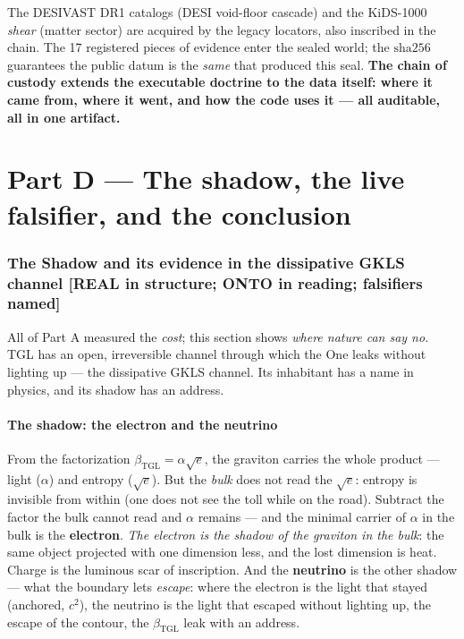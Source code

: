 \documentclass[11pt]{article}
\newcommand{\bTGL}{\beta_{\mathrm{TGL}}}\newcommand{\Msun}{M_{\odot}}\newcommand{\TGL}{\mathrm{TGL}}
\theoremstyle{definition}\newtheorem{deriv}{Derivation}
\begin{document}
The DESIVAST DR1 catalogs (DESI void-floor cascade) and the KiDS-1000 \emph{shear} (matter sector) are acquired by the legacy locators, also inscribed in the chain. The 17 registered pieces of evidence enter the sealed world; the $\mathrm{sha}256$ guarantees the public datum is the \emph{same} that produced this seal. \textbf{The chain of custody extends the executable doctrine to the data itself: where it came from, where it went, and how the code uses it --- all auditable, all in one artifact.}

\part{Part D --- The shadow, the live falsifier, and the conclusion}

\section{The Shadow and its evidence in the dissipative GKLS channel \textsf{[REAL in structure; ONTO in reading; falsifiers named]}}

All of Part A measured the \emph{cost}; this section shows \emph{where nature can say no}. TGL has an open, irreversible channel through which the One leaks without lighting up --- the dissipative GKLS channel. Its inhabitant has a name in physics, and its shadow has an address.

\subsection*{The shadow: the electron and the neutrino}

From the factorization $\bTGL=\alpha\sqrt e$, the graviton carries the whole product --- light ($\alpha$) and entropy ($\sqrt e$). But the \emph{bulk} does not read the $\sqrt e$: entropy is invisible from within (one does not see the toll while on the road). Subtract the factor the bulk cannot read and $\alpha$ remains --- and the minimal carrier of $\alpha$ in the bulk is the \textbf{electron}. \emph{The electron is the shadow of the graviton in the bulk}: the same object projected with one dimension less, and the lost dimension is heat. Charge is the luminous scar of inscription. And the \textbf{neutrino} is the other shadow --- what the boundary lets \emph{escape}: where the electron is the light that stayed (anchored, $c^2$), the neutrino is the light that escaped without lighting up, the escape of the contour, the $\bTGL$ leak with an address.
\end{document}
